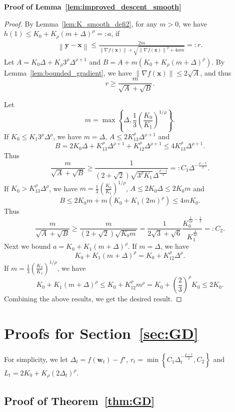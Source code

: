\documentclass{article}
\newcommand{\Norm}[1]{\left\|#1\right\|}
\newcommand{\Kr}{K_{\rho}}
\newcommand{\paren}[1]{\left( #1 \right)}
\newcommand{\bw}{\mathbf{w}}
\newcommand{\bx}{\mathbf{x}}
\newcommand{\by}{\mathbf{y}}
\begin{document}
\textbf{Proof of Lemma~\ref{lem:improved_descent_smooth}}
\begin{proof}
    By Lemma~\ref{lem:K_smooth_defi2}, for any $m>0$, we have $h(1)\leq K_0+\Kr\paren{m+\Delta}^\rho=:a$, if
    \begin{align*}
        \Norm{\by-\bx}\leq\frac{2m}{\Norm{\nabla f(\bx)}+\sqrt{\Norm{\nabla f(\bx)}^2+4am}}=:r.
    \end{align*}
     Let $A=K_0\Delta+\Kr 3^\rho\Delta^{\rho+1}$ and $B=A+m\left(K_0+\Kr\left(m+\Delta\right)^\rho\right)$.
    By Lemma~\ref{lem:bounded_gradient}, we have $\Norm{\nabla f(\bx)}\leq 2\sqrt{A}$, and thus
    $$r\geq \frac{m}{\sqrt{A}+\sqrt{B}}.$$

    Let $$m=\max\left\{\Delta, \frac{1}{3}\left(\frac{K_0}{K_1}\right)^{1/\rho}\right\}.$$
    If $K_0\leq K_1 3^\rho\Delta^\rho$, 
    we have $m=\Delta$, $A\leq 2K_13^\rho\Delta^{\rho+1}$ 
    and 
    $$B=2K_0\Delta + K_13^\rho\Delta^{\rho+1}+K_12^\rho\Delta^{\rho+1}\leq 4K_13^\rho\Delta^{\rho+1}.$$
    Thus 
    $$\frac{m}{\sqrt{A}+\sqrt{B}}\geq \frac{1}{\left(2+\sqrt{2}\right)\sqrt{3^\rho K_1}\Delta^{\frac{\rho-1}{2}}}=:C_1\Delta^{-\frac{\rho-1}{2}}.$$
    If $K_0 > K_13^\rho\Delta^\rho$, 
    we have $m=\frac{1}{3}\left(\frac{K_0}{K_1}\right)^{1/\rho}$, $A\leq 2K_0\Delta\leq 2K_0m$ 
    and 
    $$B\leq 2K_0m + m\left(K_0+K_1\left(2m\right)^\rho\right)\leq 4mK_0.$$
    Thus 
    $$\frac{m}{\sqrt{A}+\sqrt{B}}\geq \frac{m}{\left(2+\sqrt{2}\right)\sqrt{K_0m}}=\frac{1}{2\sqrt{3}+\sqrt{6}}\frac{K_0^{\frac{1}{2\rho}-\frac{1}{2}}}{K_1^{\frac{1}{2\rho}}}=:C_2.$$
    Next we bound $a=K_0+K_1\left(m+\Delta\right)^\rho$. If $m=\Delta$, we have
    $$K_0+K_1\left(m+\Delta\right)^\rho=K_0+K_12^\rho\Delta^\rho.$$
    If $m=\frac{1}{3}\left(\frac{K_0}{K_1}\right)^{1/\rho}$, we have
    $$K_0+K_1\left(m+\Delta\right)^\rho\leq K_0+K_12^\rho m^\rho=K_0+\left(\frac{2}{3}\right)^\rho K_0\leq 2K_0.$$
    Combining the above results, we get the desired result.
\end{proof}




\section{Proofs for Section~\ref{sec:GD}}
For simplicity, we let $\Delta_t=f(\bw_t)-f^\star$, $r_t=\min\left\{C_1\Delta_t^{-\frac{\rho-1}{2}},C_2\right\}$ and $L_t=2K_0+\Kr\paren{2\Delta_t}^\rho$.




\subsection{Proof of Theorem~\ref{thm:GD}}\label{apx:proof_GD}
\end{document}
